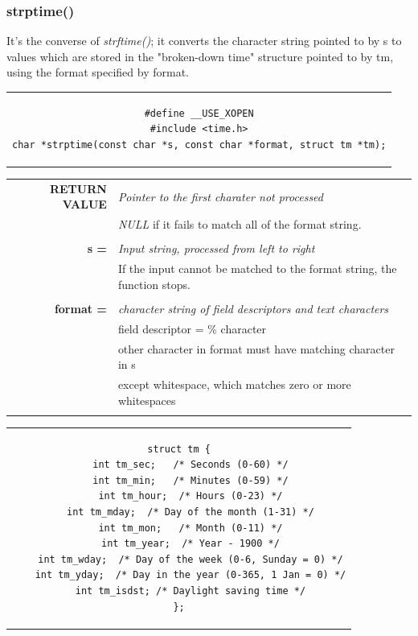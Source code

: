 \subsubsection{strptime()}
It's the converse of \textit{strftime()}; it converts the character string pointed to by s to values which are stored in the "broken-down  time"  structure pointed to by tm, using the format specified by format.
\begin{center}
\begin{tabular}{c}
\begin{lstlisting}[linewidth=340pt, basicstyle=\footnotesize\sffamily,]
#define __USE_XOPEN
#include <time.h>
char *strptime(const char *s, const char *format, struct tm *tm);
\end{lstlisting}
\end{tabular}
\end{center}

\begin{table}[H]
\centering\footnotesize
\begin{tabular}{rl}
\textbf{RETURN VALUE} & {\textit{Pointer to the first charater not processed}}\\
{} & {\textit{NULL} if it fails to match all of the format string.}\\
& \\
\textbf{s =} & {\textit{Input string, processed from left to right}}\\
{}&{If the input cannot be matched to the format string, the function stops.}\\
& \\
\textbf{format =} & {\textit{character string of field descriptors and text characters}}\\
{}&{field descriptor = \% character}\\
{}&{other character in format must have matching character in s}\\
{}&{except whitespace, which matches zero or more whitespaces}\\
& \\
\end{tabular}
\end{table}

\begin{center}
\begin{tabular}{c}
\begin{lstlisting}[linewidth=300pt, basicstyle=\footnotesize\sffamily,]
struct tm {
	int tm_sec;   /* Seconds (0-60) */
	int tm_min;   /* Minutes (0-59) */
	int tm_hour;  /* Hours (0-23) */
	int tm_mday;  /* Day of the month (1-31) */
	int tm_mon;   /* Month (0-11) */
	int tm_year;  /* Year - 1900 */
	int tm_wday;  /* Day of the week (0-6, Sunday = 0) */
	int tm_yday;  /* Day in the year (0-365, 1 Jan = 0) */
	int tm_isdst; /* Daylight saving time */
};
\end{lstlisting}
\end{tabular}
\end{center}

